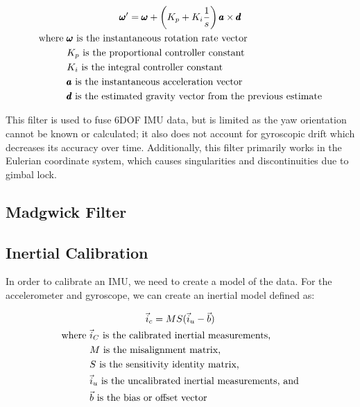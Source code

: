 \begin{gather}
    \label{eq:mahony_filter}
    \pmb{\omega}' = \pmb{\omega} + \left(K_p + K_i\frac{1}{s}\right) \pmb{a} \times \pmb{d} \\
    \begin{aligned}
        \text{where } & \pmb{\omega} \text{ is the instantaneous rotation rate vector} \\
        & K_p \text{ is the proportional controller constant} \\
        & K_i \text{ is the integral controller constant} \\
        & \pmb{a} \text{ is the instantaneous acceleration vector} \\
        & \pmb{d} \text{ is the estimated gravity vector from the previous estimate} \\
    \end{aligned} \notag
\end{gather}

This filter is used to fuse 6DOF IMU data, but is limited as the yaw orientation cannot be known or calculated; it also does not account for gyroscopic drift which decreases its accuracy over time.
Additionally, this filter primarily works in the Eulerian coordinate system, which causes singularities and discontinuities due to gimbal lock.

\subsection{Madgwick Filter} \label{ssec:madgewick_filter}

\subsection{Inertial Calibration}

In order to calibrate an IMU, we need to create a model of the data. For the accelerometer and gyroscope, we can create an inertial model defined as:

\begin{gather}
    \vec{i}_c=MS(\vec{i}_u-\vec{b}) \\
    \begin{aligned}
        \text{where } & \vec{i}_C \text{ is the calibrated inertial measurements,} \\ 
        & M \text{ is the misalignment matrix,} \\
        & S \text{ is the sensitivity identity matrix,} \\
        & \vec{i}_u \text{ is the uncalibrated inertial measurements, and} \\
        & \vec{b} \text{ is the bias or offset vector}
    \end{aligned} \notag
\end{gather}

